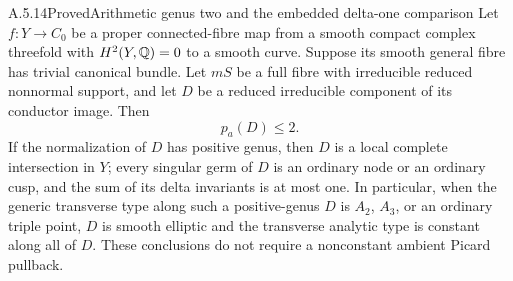 \begin{statement}{A.5.14}{Proved}{Arithmetic genus two and the embedded delta-one comparison}
Let $f:Y\to C_0$ be a proper connected-fibre map from a
smooth compact complex threefold with $H^2(Y,\mathbb Q)=0$ to
a smooth curve. Suppose its smooth general fibre has
trivial canonical bundle. Let $mS$ be a full fibre with
irreducible reduced nonnormal support, and let $D$ be
a reduced irreducible component of its conductor image.
Then
\[
                         p_a(D)\le2.                \tag{A.J.30}
\]
If the normalization of $D$ has positive genus, then
$D$ is a local complete intersection in $Y$; every
singular germ of $D$ is an ordinary node or an ordinary
cusp, and the sum of its delta invariants is at most
one. In particular, when the generic transverse type
along such a positive-genus $D$ is $A_2$, $A_3$, or an
ordinary triple point, $D$ is smooth elliptic and the
transverse analytic type is constant along all of $D$.
These conclusions do not require a nonconstant ambient
Picard pullback.
\end{statement}
